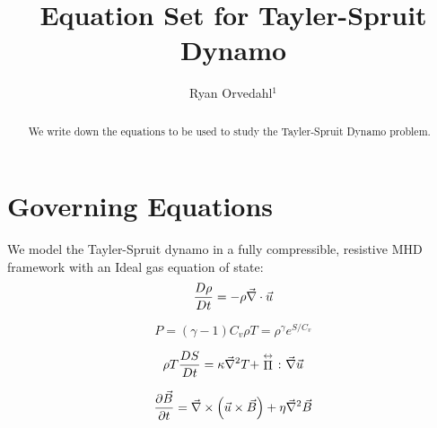 \documentclass[apj,onecolumn]{emulateapj}
\newcommand{\uvec}{\ensuremath{\vec{u}}} %
\newcommand{\Bvec}{\ensuremath{\vec{B}}} %
\begin{document}
\title{Equation Set for Tayler-Spruit Dynamo}
\author{Ryan Orvedahl$^1$}

\begin{abstract}
We write down the equations to be used to study the Tayler-Spruit Dynamo 
problem.
\end{abstract}


\maketitle

\section{Governing Equations}
\label{sec:eqns}
We model the Tayler-Spruit dynamo in a fully compressible, resistive MHD 
framework with an Ideal gas equation of state:
\begin{equation}
\DxDt{\rho} = - \rho\del\cdot\uvec
\end{equation}

\begin{equation}
P=(\gamma - 1)C_v \rho T = \rho^\gamma e^{S/C_v}
\end{equation}

\begin{equation}
\rho T \DxDt{S} = \kappa\del^2 T +
 \stackrel{\leftrightarrow}{\Pi} \mathbf{\colon} \del \uvec
\end{equation}

\begin{equation}
\dxdt{\Bvec} = \del \times \left(\uvec\times\Bvec\right) + \eta\del^2\Bvec
\end{equation}
\end{document}
